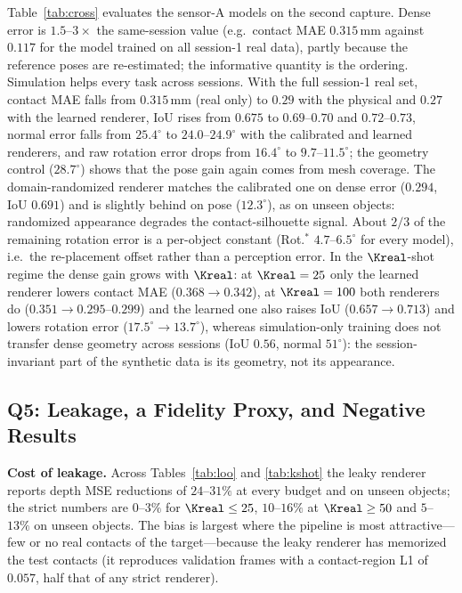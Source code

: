 Table~\ref{tab:cross} evaluates the sensor-A models on the second capture. Dense error is $1.5$--$3\times$ the same-session value (e.g.\ contact MAE $0.315\,$mm against $0.117$ for the model trained on all session-1 real data), partly because the reference poses are re-estimated; the informative quantity is the ordering. Simulation helps every task across sessions. With the full session-1 real set, contact MAE falls from $0.315\,$mm (real only) to $0.29$ with the physical and $0.27$ with the learned renderer, IoU rises from $0.675$ to $0.69$--$0.70$ and $0.72$--$0.73$, normal error falls from $25.4^\circ$ to $24.0$--$24.9^\circ$ with the calibrated and learned renderers, and raw rotation error drops from $16.4^\circ$ to $9.7$--$11.5^\circ$; the geometry control ($28.7^\circ$) shows that the pose gain again comes from mesh coverage. The domain-randomized renderer matches the calibrated one on dense error ($0.294$, IoU $0.691$) and is slightly behind on pose ($12.3^\circ$), as on unseen objects: randomized appearance degrades the contact-silhouette signal. About $2/3$ of the remaining rotation error is a per-object constant (Rot.$^{\ast}$ $4.7$--$6.5^\circ$ for every model), i.e.\ the re-placement offset rather than a perception error. In the $\Kreal$-shot regime the dense gain grows with $\Kreal$: at $\Kreal=25$ only the learned renderer lowers contact MAE ($0.368\!\to\!0.342$), at $\Kreal=100$ both renderers do ($0.351\!\to\!0.295$--$0.299$) and the learned one also raises IoU ($0.657\!\to\!0.713$) and lowers rotation error ($17.5^\circ\!\to\!13.7^\circ$), whereas simulation-only training does not transfer dense geometry across sessions (IoU $0.56$, normal $51^\circ$): the session-invariant part of the synthetic data is its geometry, not its appearance.

\subsection{Q5: Leakage, a Fidelity Proxy, and Negative Results}
\label{sec:fidelity}

\noindent\textbf{Cost of leakage.} Across Tables~\ref{tab:loo} and \ref{tab:kshot} the leaky renderer reports depth MSE reductions of $24$--$31\%$ at every budget and on unseen objects; the strict numbers are $0$--$3\%$ for $\Kreal\le25$, $10$--$16\%$ at $\Kreal\ge50$ and $5$--$13\%$ on unseen objects. The bias is largest where the pipeline is most attractive---few or no real contacts of the target---because the leaky renderer has memorized the test contacts (it reproduces validation frames with a contact-region L1 of $0.057$, half that of any strict renderer).

